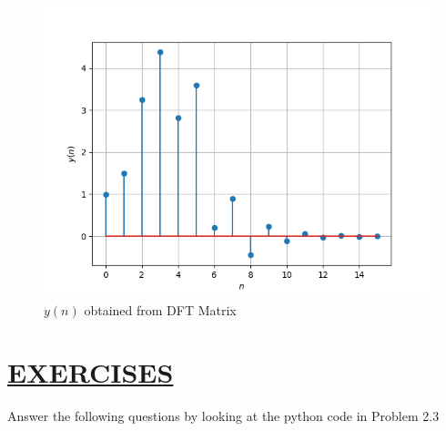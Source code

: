 \documentclass[journal,12pt,twocolumn]{IEEEtran}
\theoremstyle{remark}
\begin{document}
\begin{figure}[htbp]
\centering
\includegraphics[width=\columnwidth]{figs/yn_DFT_matrix.png}
\caption{$y(n)$ obtained from DFT Matrix}
\label{fig:yn_DFT_matrix}
\end{figure}



\section{\underline{EXERCISES}}
\noindent Answer the following questions by looking at the python code in Problem 2.3
\end{document}
